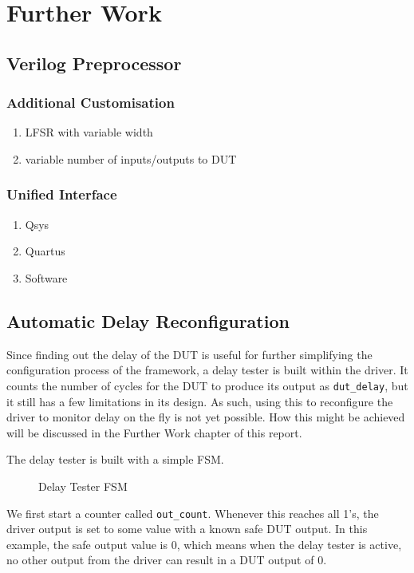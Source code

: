 \chapter{Further Work}

\section{Verilog Preprocessor}

\subsection{Additional Customisation}
\begin{enumerate}
  \item LFSR with variable width
  \item variable number of inputs/outputs to DUT
\end{enumerate}

\subsection{Unified Interface}
\begin{enumerate}
  \item Qsys
  \item Quartus
  \item Software
\end{enumerate}


\section{Automatic Delay Reconfiguration}

Since finding out the delay of the DUT is useful for further simplifying the configuration process of the framework, a delay tester is built within the driver.
It counts the number of cycles for the DUT to produce its output as \texttt{dut\_delay}, but it still has a few limitations in its design.
As such, using this to reconfigure the driver to monitor delay on the fly is not yet possible.
How this might be achieved will be discussed in the Further Work chapter of this report.

The delay tester is built with a simple FSM.

\begin{figure}[H]
  \centering
  
  \caption{Delay Tester FSM}
  \label{DelayTesterFSM}
\end{figure}

We first start a counter called \texttt{out\_count}.
Whenever this reaches all 1's, the driver output is set to some value with a known safe DUT output.
In this example, the safe output value is 0, which means when the delay tester is active, no other output from the driver can result in a DUT output of 0.

